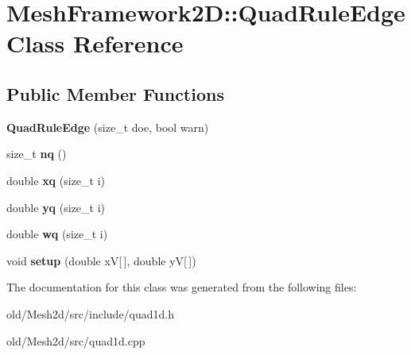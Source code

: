 \hypertarget{classMeshFramework2D_1_1QuadRuleEdge}{}\section{Mesh\+Framework2D\+:\+:Quad\+Rule\+Edge Class Reference}
\label{classMeshFramework2D_1_1QuadRuleEdge}
\subsection*{Public Member Functions}
\begin{DoxyCompactItemize}
\item 
\mbox{\label{classMeshFramework2D_1_1QuadRuleEdge_abb254b22a706f3781b2b8a7b3fafa288}} 
{\bfseries Quad\+Rule\+Edge} (size\+\_\+t doe, bool warn)
\item 
\mbox{\label{classMeshFramework2D_1_1QuadRuleEdge_af245dd9ab99a15742641d81f5508041a}} 
size\+\_\+t {\bfseries nq} ()
\item 
\mbox{\label{classMeshFramework2D_1_1QuadRuleEdge_a1b03cf6a6800470a027f570d44338a1f}} 
double {\bfseries xq} (size\+\_\+t i)
\item 
\mbox{\label{classMeshFramework2D_1_1QuadRuleEdge_ac272eee335dc95a46787e1a054b38cb7}} 
double {\bfseries yq} (size\+\_\+t i)
\item 
\mbox{\label{classMeshFramework2D_1_1QuadRuleEdge_a3fc5a686c8018dbea8ec3a120ad6d9bc}} 
double {\bfseries wq} (size\+\_\+t i)
\item 
\mbox{\label{classMeshFramework2D_1_1QuadRuleEdge_a56ca5d37f1c93f74aba256e310392d00}} 
void {\bfseries setup} (double xV\mbox{[}$\,$\mbox{]}, double yV\mbox{[}$\,$\mbox{]})
\end{DoxyCompactItemize}


The documentation for this class was generated from the following files\+:\begin{DoxyCompactItemize}
\item 
old/\+Mesh2d/src/include/quad1d.\+h\item 
old/\+Mesh2d/src/quad1d.\+cpp\end{DoxyCompactItemize}
